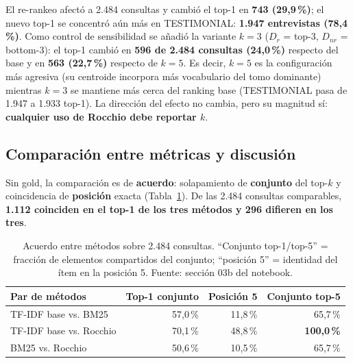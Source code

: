 \documentclass[11pt]{tg_usta}
\begin{document}
El re-rankeo afectó a 2.484 consultas y cambió el top-1 en \textbf{743 (29,9\,\%)}; el nuevo top-1 se concentró aún más en TESTIMONIAL: \textbf{1.947 entrevistas (78,4\,\%)}. Como control de sensibilidad se añadió la variante $k=3$ ($D_r$ = top-3, $D_{nr}$ = bottom-3): el top-1 cambió en \textbf{596 de 2.484 consultas (24,0\,\%)} respecto del base y en \textbf{563 (22,7\,\%)} respecto de $k=5$. Es decir, $k=5$ es la configuración más agresiva (su centroide incorpora más vocabulario del tomo dominante) mientras $k=3$ se mantiene más cerca del ranking base (TESTIMONIAL pasa de 1.947 a 1.933 top-1). La dirección del efecto no cambia, pero su magnitud sí: \textbf{cualquier uso de Rocchio debe reportar $k$}.

\subsection{Comparación entre métricas y discusión}

Sin gold, la comparación es de \textbf{acuerdo}: solapamiento de \textbf{conjunto} del top-$k$ y coincidencia de \textbf{posición} exacta (Tabla~\ref{tab:acuerdo}). De las 2.484 consultas comparables, \textbf{1.112 coinciden en el top-1 de los tres métodos y 296 difieren en los tres}.

\begin{table}[H]
    \centering
    \caption{Acuerdo entre métodos sobre 2.484 consultas. ``Conjunto top-1/top-5'' = fracción de elementos compartidos del conjunto; ``posición 5'' = identidad del ítem en la posición 5. Fuente: sección 03b del notebook.}
    \small
    \setlength{\tabcolsep}{6pt}
    \begin{tabular}{l r r r}
    \toprule
    Par de métodos & Top-1 conjunto & Posición 5 & Conjunto top-5 \\
    \midrule
    TF-IDF base vs. BM25 & 57,0\,\% & 11,8\,\% & 65,7\,\% \\
    TF-IDF base vs. Rocchio & 70,1\,\% & 48,8\,\% & \textbf{100,0\,\%} \\
    BM25 vs. Rocchio & 50,6\,\% & 10,5\,\% & 65,7\,\% \\
    \bottomrule
    \end{tabular}
    \label{tab:acuerdo}
\end{table}
\end{document}
